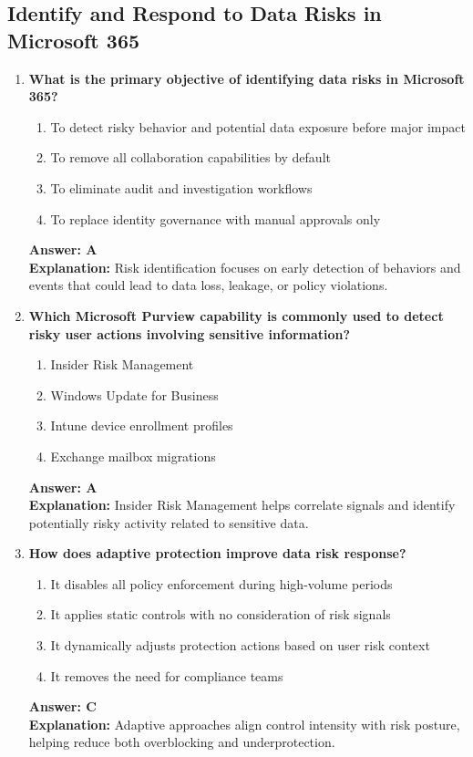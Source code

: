 \documentclass[10pt]{article}
\begin{document}
\subsection{Identify and Respond to Data Risks in Microsoft 365}
\begin{enumerate}[leftmargin=*]

\item \textbf{What is the primary objective of identifying data risks in Microsoft 365?}
\begin{enumerate}[label=\Alph*.]
  \item To detect risky behavior and potential data exposure before major impact
  \item To remove all collaboration capabilities by default
  \item To eliminate audit and investigation workflows
  \item To replace identity governance with manual approvals only
\end{enumerate}
\textbf{Answer: A}\\
\textbf{Explanation:} Risk identification focuses on early detection of behaviors and events that could lead to data loss, leakage, or policy violations.

\item \textbf{Which Microsoft Purview capability is commonly used to detect risky user actions involving sensitive information?}
\begin{enumerate}[label=\Alph*.]
  \item Insider Risk Management
  \item Windows Update for Business
  \item Intune device enrollment profiles
  \item Exchange mailbox migrations
\end{enumerate}
\textbf{Answer: A}\\
\textbf{Explanation:} Insider Risk Management helps correlate signals and identify potentially risky activity related to sensitive data.

\item \textbf{How does adaptive protection improve data risk response?}
\begin{enumerate}[label=\Alph*.]
  \item It disables all policy enforcement during high-volume periods
  \item It applies static controls with no consideration of risk signals
  \item It dynamically adjusts protection actions based on user risk context
  \item It removes the need for compliance teams
\end{enumerate}
\textbf{Answer: C}\\
\textbf{Explanation:} Adaptive approaches align control intensity with risk posture, helping reduce both overblocking and underprotection.


\end{enumerate}
\end{document}
